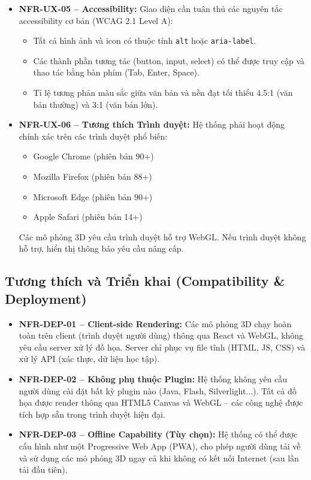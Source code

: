 \begin{itemize}
    \item \textbf{NFR-UX-05 – Accessibility:} Giao diện cần tuân thủ các nguyên tắc accessibility cơ bản (WCAG 2.1 Level A):
    \begin{itemize}
        \item Tất cả hình ảnh và icon có thuộc tính \texttt{alt} hoặc \texttt{aria-label}.
        \item Các thành phần tương tác (button, input, select) có thể được truy cập và thao tác bằng bàn phím (Tab, Enter, Space).
        \item Tỉ lệ tương phản màu sắc giữa văn bản và nền đạt tối thiểu 4.5:1 (văn bản thường) và 3:1 (văn bản lớn).
    \end{itemize}
    
    \item \textbf{NFR-UX-06 – Tương thích Trình duyệt:} Hệ thống phải hoạt động chính xác trên các trình duyệt phổ biến:
    \begin{itemize}
        \item Google Chrome (phiên bản 90+)
        \item Mozilla Firefox (phiên bản 88+)
        \item Microsoft Edge (phiên bản 90+)
        \item Apple Safari (phiên bản 14+)
    \end{itemize}
    Các mô phỏng 3D yêu cầu trình duyệt hỗ trợ WebGL. Nếu trình duyệt không hỗ trợ, hiển thị thông báo yêu cầu nâng cấp.
\end{itemize}

\subsection{Tương thích và Triển khai (Compatibility \& Deployment)}

\begin{itemize}
    \item \textbf{NFR-DEP-01 – Client-side Rendering:} Các mô phỏng 3D chạy hoàn toàn trên client (trình duyệt người dùng) thông qua React và WebGL, không yêu cầu server xử lý đồ họa. Server chỉ phục vụ file tĩnh (HTML, JS, CSS) và xử lý API (xác thực, dữ liệu học tập).
    
    \item \textbf{NFR-DEP-02 – Không phụ thuộc Plugin:} Hệ thống không yêu cầu người dùng cài đặt bất kỳ plugin nào (Java, Flash, Silverlight...). Tất cả đồ họa được render thông qua HTML5 Canvas và WebGL – các công nghệ được tích hợp sẵn trong trình duyệt hiện đại.
    
    \item \textbf{NFR-DEP-03 – Offline Capability (Tùy chọn):} Hệ thống có thể được cấu hình như một Progressive Web App (PWA), cho phép người dùng tải về và sử dụng các mô phỏng 3D ngay cả khi không có kết nối Internet (sau lần tải đầu tiên).
\end{itemize}

